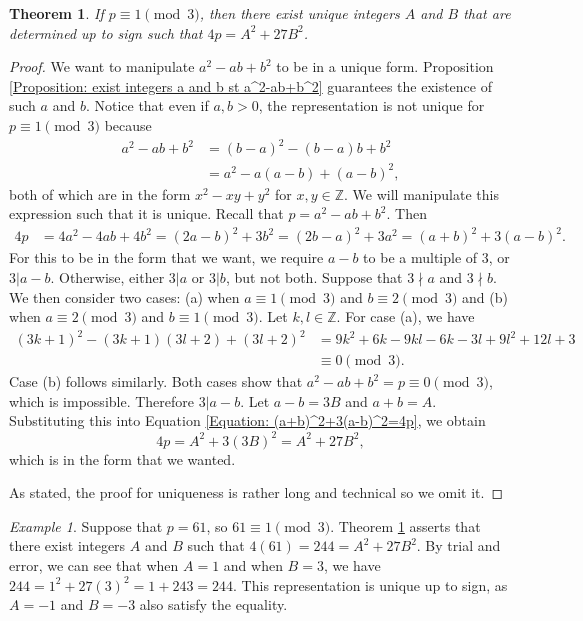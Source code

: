 \documentclass[10pt]{amsart}
\newcommand{\ZZ}{\mathbb{Z}}
\theoremstyle{plain}
\newtheorem{thm}{Theorem}
\theoremstyle{definition}
\theoremstyle{remark}
\newtheorem{ex}{Example}
\numberwithin{equation}{section}
\begin{document}
\begin{thm}\label{Theorem: exist unique integers st A^2+27B^2=4p}
    If $p\equiv 1\pmod{3}$, then there exist unique integers $A$ and $B$ that are determined up to sign such that $4p=A^{2}+27B^{2}$.
\end{thm}
\begin{proof}
    We want to manipulate $a^{2}-ab+b^{2}$ to be in a unique form. Proposition \ref{Proposition: exist integers a and b st a^2-ab+b^2} guarantees the existence of such $a$ and $b$. Notice that even if $a,b>0$, the representation is not unique for $p\equiv 1\pmod{3}$ because
    \begin{align*}
        a^{2}-ab+b^{2} & = (b-a)^{2}-(b-a)b+b^{2} \\ & = a^{2}-a(a-b)+(a-b)^{2},
    \end{align*}
    both of which are in the form $x^{2}-xy+y^{2}$ for $x,y\in\ZZ$. We will manipulate this expression such that it is unique. Recall that $p=a^{2}-ab+b^{2}$. Then 
    \begin{align}
        4p & = 4a^{2}-4ab+4b^{2} = (2a-b)^{2}+3b^{2} = (2b-a)^{2}+3a^{2} = (a+b)^{2}+3(a-b)^{2}. \label{Equation: (a+b)^2+3(a-b)^2=4p}
    \end{align}
    For this to be in the form that we want, we require $a-b$ to be a multiple of $3$, or $3|a-b$. Otherwise, either $3|a$ or $3|b$, but not both. Suppose that $3\nmid a$ and $3\nmid b$. We then consider two cases: (a) when $a\equiv 1\pmod{3}$ and $b\equiv 2\pmod{3}$ and (b) when $a\equiv 2\pmod{3}$ and $b\equiv 1\pmod{3}$. Let $k,l\in\ZZ$. For case (a), we have
    \begin{align*}
        (3k+1)^{2}-(3k+1)(3l+2)+(3l+2)^{2} & = 9k^{2}+6k-9kl-6k-3l+9l^{2}+12l+3 \\ & \equiv 0\pmod{3}.
    \end{align*}
    Case (b) follows similarly. Both cases show that $a^{2}-ab+b^{2}=p\equiv 0\pmod{3}$, which is impossible. Therefore $3|a-b$. Let $a-b=3B$ and $a+b=A$. Substituting this into Equation \eqref{Equation: (a+b)^2+3(a-b)^2=4p}, we obtain
    \begin{equation*}
        4p=A^{2}+3(3B)^{2} = A^{2}+27B^{2},
    \end{equation*}
    which is in the form that we wanted.

    As stated, the proof for uniqueness is rather long and  technical so we omit it. 
\end{proof}

\begin{ex}
    Suppose that $p=61$, so $61\equiv 1\pmod{3}$. Theorem \ref{Theorem: exist unique integers st A^2+27B^2=4p} asserts that there exist integers $A$ and $B$ such that $4(61)=244=A^{2}+27B^{2}$. By trial and error, we can see that when $A=1$ and when $B=3$, we have $244=1^{2}+27(3)^{2}=1+243=244$. This representation is unique up to sign, as $A=-1$ and $B=-3$ also satisfy the equality. 
\end{ex}
\end{document}
